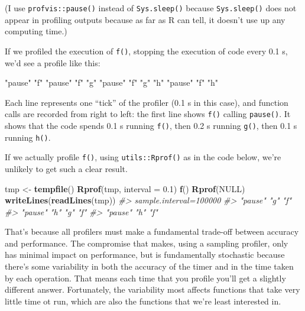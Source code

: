 \documentclass[]{book}
\makeatletter
\newenvironment{Shaded}{\begin{snugshade}}{\end{snugshade}}
\newcommand{\CommentTok}[1]{\textcolor[rgb]{0.37,0.37,0.37}{\textit{#1}}}
\newcommand{\DataTypeTok}[1]{\textcolor[rgb]{0.27,0.27,0.27}{#1}}
\newcommand{\FloatTok}[1]{\textcolor[rgb]{0.06,0.06,0.06}{#1}}
\newcommand{\KeywordTok}[1]{\textcolor[rgb]{0.27,0.27,0.27}{\textbf{#1}}}
\newcommand{\NormalTok}[1]{#1}
\newcommand{\OtherTok}[1]{\textcolor[rgb]{0.37,0.37,0.37}{#1}}
\newcommand{\StringTok}[1]{\textcolor[rgb]{0.5,0.5,0.5}{#1}}
\newcommand{\indexc}[1]{\index{#1@\texttt{#1}}}
\makeatother
\begin{document}
(I use \texttt{profvis::pause()} instead of \texttt{Sys.sleep()} because \texttt{Sys.sleep()} does not appear in profiling outputs because as far as R can tell, it doesn't use up any computing time.) \indexc{pause()}

If we profiled the execution of \texttt{f()}, stopping the execution of code every 0.1 s, we'd see a profile like this:

\begin{Shaded}
\begin{Highlighting}[]
\StringTok{"pause"} \StringTok{"f"} 
\StringTok{"pause"} \StringTok{"f"} \StringTok{"g"}
\StringTok{"pause"} \StringTok{"f"} \StringTok{"g"} \StringTok{"h"}
\StringTok{"pause"} \StringTok{"f"} \StringTok{"h"}
\end{Highlighting}
\end{Shaded}

Each line represents one ``tick'' of the profiler (0.1 s in this case), and function calls are recorded from right to left: the first line shows \texttt{f()} calling \texttt{pause()}. It shows that the code spends 0.1 s running \texttt{f()}, then 0.2 s running \texttt{g()}, then 0.1 s running \texttt{h()}.

If we actually profile \texttt{f()}, using \texttt{utils::Rprof()} as in the code below, we're unlikely to get such a clear result.

\begin{Shaded}
\begin{Highlighting}[]
\NormalTok{tmp <-}\StringTok{ }\KeywordTok{tempfile}\NormalTok{()}
\KeywordTok{Rprof}\NormalTok{(tmp, }\DataTypeTok{interval =} \FloatTok{0.1}\NormalTok{)}
\KeywordTok{f}\NormalTok{()}
\KeywordTok{Rprof}\NormalTok{(}\OtherTok{NULL}\NormalTok{)}
\KeywordTok{writeLines}\NormalTok{(}\KeywordTok{readLines}\NormalTok{(tmp))}
\CommentTok{#> sample.interval=100000}
\CommentTok{#> "pause" "g" "f" }
\CommentTok{#> "pause" "h" "g" "f" }
\CommentTok{#> "pause" "h" "f" }
\end{Highlighting}
\end{Shaded}

That's because all profilers must make a fundamental trade-off between accuracy and performance. The compromise that makes, using a sampling profiler, only has minimal impact on performance, but is fundamentally stochastic because there's some variability in both the accuracy of the timer and in the time taken by each operation. That means each time that you profile you'll get a slightly different answer. Fortunately, the variability most affects functions that take very little time ot run, which are also the functions that we're least interested in.
\end{document}
